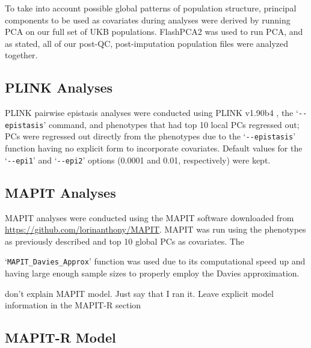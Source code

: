 \documentclass[12pt,a4paper]{article}
\begin{document}
To take into account possible global patterns of population structure, principal components to be used as covariates during analyses were derived by running PCA on our full set of UKB populations. FlashPCA2 was used to run PCA, and as stated, all of our post-QC, post-imputation population files were analyzed together.    

\subsection{PLINK Analyses}

PLINK pairwise epistasis analyses were conducted using PLINK v1.90b4 \citep{Purcell2007}, the `\texttt{-{}-epistasis}' command, and phenotypes that had top 10 local PCs regressed out; PCs were regressed out directly from the phenotypes due to the `\texttt{-{}-epistasis}' function having no explicit form to incorporate covariates. Default values for the `\texttt{-{}-epi1}' and `\texttt{-{}-epi2}' options (0.0001 and 0.01, respectively) were kept.   

\subsection{MAPIT Analyses}

MAPIT analyses were conducted using the MAPIT software downloaded from \url{https://github.com/lorinanthony/MAPIT}. MAPIT was run using the phenotypes as previously described and top 10 global PCs as covariates. The

\noindent `\texttt{MAPIT\_Davies\_Approx}' function was used due to its computational speed up and having large enough sample sizes to properly employ the Davies approximation.  


don't explain MAPIT model. Just say that I ran it. Leave explicit model information in the MAPIT-R section



\subsection{MAPIT-R Model}
\end{document}
